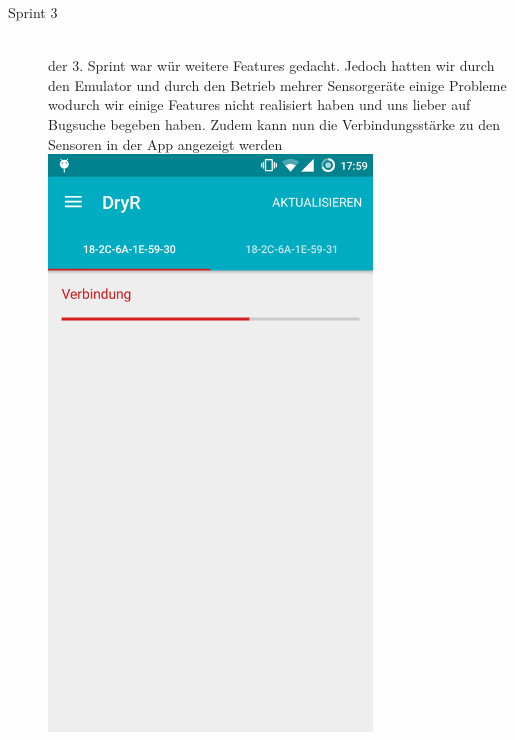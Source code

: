 \begin{description}
	\item [Sprint 3] \hfill \\
		der 3. Sprint war wür weitere Features gedacht. 
		Jedoch hatten wir durch den Emulator und durch den Betrieb mehrer Sensorgeräte einige Probleme wodurch wir einige Features nicht realisiert haben und uns lieber auf Bugsuche begeben haben. Zudem kann nun die Verbindungsstärke zu den Sensoren in der App angezeigt werden
		\includegraphics[width=0.7\textwidth]{sensor_status_reception.png}

\end{description}
